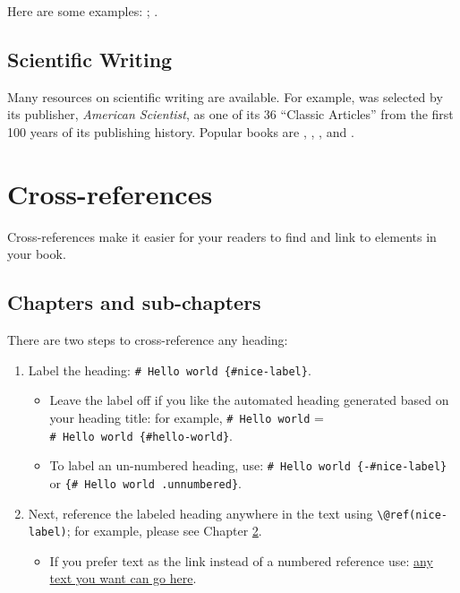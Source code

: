 \documentclass[
]{book}
\providecommand{\tightlist}{%
  \setlength{\itemsep}{0pt}\setlength{\parskip}{0pt}}
\theoremstyle{definition}
\theoremstyle{definition}
\theoremstyle{definition}
\theoremstyle{definition}
\theoremstyle{remark}
\begin{document}
Here are some examples: \citet{li2023regularized}; \citet{lau2022bias}.

\section{Scientific Writing}\label{scientific-writing}

Many resources on scientific writing are available. For example,
\citet{gopen1990science} was selected by its publisher, \emph{American Scientist},
as one of its 36 ``Classic Articles'' from the first 100 years of its
publishing history. Popular books are
\citet{oshima2000writing}, \citet{gopen2004expectations}, \citet{hairston2003successful},
and \citet{lebrun2021scientific}.

\chapter{Cross-references}\label{cross}

Cross-references make it easier for your readers to find and link to elements in your book.

\section{Chapters and sub-chapters}\label{chapters-and-sub-chapters}

There are two steps to cross-reference any heading:

\begin{enumerate}
\def\labelenumi{\arabic{enumi}.}
\tightlist
\item
  Label the heading: \texttt{\#\ Hello\ world\ \{\#nice-label\}}.

  \begin{itemize}
  \tightlist
  \item
    Leave the label off if you like the automated heading generated based on your heading title: for example, \texttt{\#\ Hello\ world} = \texttt{\#\ Hello\ world\ \{\#hello-world\}}.
  \item
    To label an un-numbered heading, use: \texttt{\#\ Hello\ world\ \{-\#nice-label\}} or \texttt{\{\#\ Hello\ world\ .unnumbered\}}.
  \end{itemize}
\item
  Next, reference the labeled heading anywhere in the text using \texttt{\textbackslash{}@ref(nice-label)}; for example, please see Chapter \ref{cross}.

  \begin{itemize}
  \tightlist
  \item
    If you prefer text as the link instead of a numbered reference use: \hyperref[cross]{any text you want can go here}.
  \end{itemize}
\end{enumerate}
\end{document}
